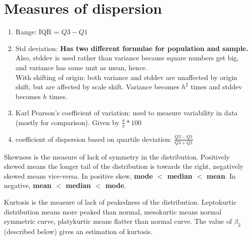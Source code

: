 \documentclass{article}
\begin{document}
\section{Measures of dispersion}
\begin{enumerate}
    \item Range: IQR = $Q3 - Q1$
    \item Std deviation: \textbf{Has two different formulae for population and sample.} Also,
    stddev is used rather than variance because square numbers get big, and variance has same unit as mean, hence. \\
    With shifting of origin: both variance and stddev are unaffected by origin shift, but are affected by 
    scale shift. Variance becomes $h^{2}$ times and stddev becomes $h$ times.
    \item Karl Pearson's coefficient of variation: used to measure variability in data (mostly for comparison). Given by $\frac{\sigma}{\bar{x}}*100$
    \item coefficient of dispersion based on quartile deviation: $\frac{Q3-Q1}{Q3+Q1}$

\end{enumerate}
\begin{definition}[Skewness]
    Skewness is the measure of lack of symmetry in the distribution. Positively skewed means the longer tail of the
    distribution is towards the right, negatively skewed means vice-versa. In positive skew, \textbf{mode $<$ median $<$ mean}. 
    In negative, \textbf{mean $<$ median $<$ mode}.
\end{definition}

\begin{definition}[Kurtosis]
    Kurtosis is the measure of lack of peakedness of the distribution. Leptokurtic distribution means more peaked than normal, mesokurtic
    means normal symmetric curve, platykurtic means flatter than normal curve. The value of $\beta_{2}$ (described below)
    gives an estimation of kurtosis.
\end{definition}
\end{document}

